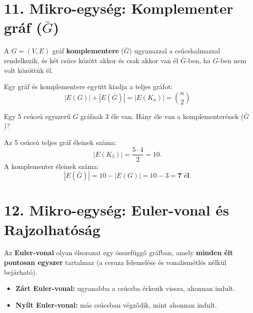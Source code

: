 \documentclass[a4paper,12pt]{article}
\begin{document}
\vspace{0.4cm}
\section{11. Mikro-egység: Komplementer gráf (\texorpdfstring{$\bar{G}$}{G komplementer})}

\begin{definiciodoboz}
A $G = (V, E)$ gráf \textbf{komplementere} ($\bar{G}$) ugyanazzal a csúcshalmazzal rendelkezik, és két csúcs között akkor és csak akkor van él $\bar{G}$-ben, ha $G$-ben nem volt közöttük él.
\end{definiciodoboz}

Egy gráf és komplementere együtt kiadja a teljes gráfot:
\begin{equation}
    |E(G)| + |E(\bar{G})| = |E(K_n)| = \binom{n}{2}
\end{equation}

\begin{feladatdoboz}
Egy 5 csúcsú egyszerű $G$ gráfnak 3 éle van. Hány éle van a komplementerének ($\bar{G}$)?
\end{feladatdoboz}

\begin{megoldasdoboz}
Az 5 csúcsú teljes gráf éleinek száma:
\[
    |E(K_5)| = \frac{5 \cdot 4}{2} = 10.
\]
A komplementer éleinek száma:
\[
    |E(\bar{G})| = 10 - |E(G)| = 10 - 3 = \mathbf{7\text{ él}}.
\]
\end{megoldasdoboz}

\vspace{0.4cm}
\section{12. Mikro-egység: Euler-vonal és Rajzolhatóság}

\begin{definiciodoboz}
Az \textbf{Euler-vonal} olyan élsorozat egy összefüggő gráfban, amely \textbf{minden élt pontosan egyszer} tartalmaz (a ceruza felemelése és vonalismétlés nélkül bejárható).
\begin{itemize}
    \item \textbf{Zárt Euler-vonal:} ugyanabba a csúcsba érkezik vissza, ahonnan indult.
    \item \textbf{Nyílt Euler-vonal:} más csúcsban végződik, mint ahonnan indult.
\end{itemize}
\end{definiciodoboz}
\end{document}
